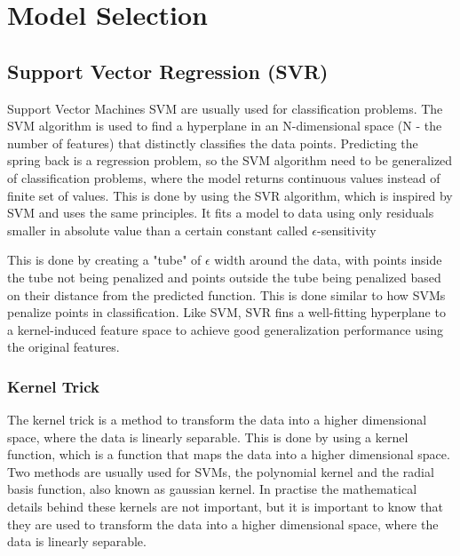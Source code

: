 \section{Model Selection}\label{sec:model-selection}

\subsection{Support Vector Regression (SVR)}\label{subsec:support-vector-regression-(svr)}
Support Vector Machines \ac{SVM} are usually used for classification problems. The \ac{SVM}
algorithm is used to find
a hyperplane in an N-dimensional space (N - the number of features) that distinctly classifies
the data points.
\cite[p. 42]{awad_efficientlearningmachines_2015}
Predicting the spring back is a regression problem, so the \ac{SVM} algorithm need to be
generalized of
classification problems, where the model returns continuous values instead of finite set of values.
This is done by using the \ac{SVR} algorithm, which is inspired by  \ac{SVM} and uses the same
principles.
It fits a model to data using only residuals smaller in absolute value than a certain constant
called
$\epsilon$-sensitivity

This is done by creating a "tube" of $\epsilon$ width around the data, with points inside the
tube not being
penalized and points outside the tube being penalized based on their distance from the predicted
function.
This is done similar to how \ac{SVM}s penalize points in classification.
Like \ac{SVM}, \ac{SVR} fins a well-fitting hyperplane to a kernel-induced feature space to
achieve good
generalization performance using the original features.
\cite[p. 369]{montesinoslopez_supportvectormachines_2022}

\subsubsection*{Kernel Trick}

The kernel trick is a method to transform the data into a higher dimensional space, where the
data is linearly
separable.
This is done by using a kernel function, which is a function that maps the data into a higher
dimensional space.
Two methods are usually used for \ac{SVM}s, the polynomial kernel and the radial basis function,
also known as gaussian kernel.
\cite[p. 97-98]{muller_introductionmachinelearning_2016}
In practise the mathematical details behind these kernels are not important, but it is important
to know that they are used to transform the data into a higher dimensional space, where the data
is linearly separable.

